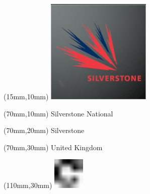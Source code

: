 \null\newpage
\begin{textblock*}{50mm}(15mm,10mm)%
\includegraphics[width=50mm]{LG/2015-05-20_00094.png}
\end{textblock*}
\begin{textblock*}{130mm}(70mm,10mm)%
{\fontsize{20}{20}\selectfont Silverstone National}\\
\end{textblock*}
\begin{textblock*}{120mm}(70mm,20mm)%
{\fontsize{16}{16}\selectfont Silverstone}\\
\end{textblock*}
\begin{textblock*}{120mm}(70mm,30mm)%
{\fontsize{12}{12}\selectfont United Kingdom}
\end{textblock*}
\begin{textblock*}{30mm}(110mm,30mm)%
\centering
\includegraphics[height=15mm]{icons/fa-rotate-right.pdf}
\end{textblock*}
